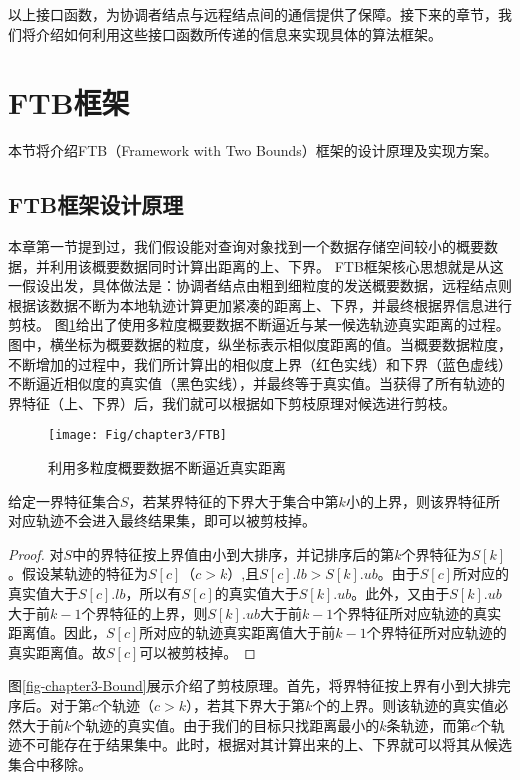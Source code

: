 	以上接口函数，为协调者结点与远程结点间的通信提供了保障。接下来的章节，我们将介绍如何利用这些接口函数所传递的信息来实现具体的算法框架。

\section{FTB框架}\label{sec-c3-FTB}
本节将介绍FTB（Framework with Two Bounds）框架的设计原理及实现方案。
\subsection{FTB框架设计原理}
本章第一节提到过，我们假设能对查询对象找到一个数据存储空间较小的概要数据，并利用该概要数据同时计算出距离的上、下界。
FTB框架核心思想就是从这一假设出发，具体做法是：协调者结点由粗到细粒度的发送概要数据，远程结点则根据该数据不断为本地轨迹计算更加紧凑的距离上、下界，并最终根据界信息进行剪枝。
图\ref{fig-chapter3-FTB}给出了使用多粒度概要数据不断逼近与某一候选轨迹真实距离的过程。图中，横坐标为概要数据的粒度，纵坐标表示相似度距离的值。当概要数据粒度，不断增加的过程中，我们所计算出的相似度上界（红色实线）和下界（蓝色虚线）不断逼近相似度的真实值（黑色实线），并最终等于真实值。当获得了所有轨迹的界特征（上、下界）后，我们就可以根据如下剪枝原理对候选进行剪枝。
\begin{figure}
	\centering
	\texttt{[image: Fig/chapter3/FTB]}
	\caption{利用多粒度概要数据不断逼近真实距离}
	\label{fig-chapter3-FTB}
\end{figure}



\begin{lemma}
	给定一界特征集合$S$，若某界特征的下界大于集合中第$k$小的上界，则该界特征所对应轨迹不会进入最终结果集，即可以被剪枝掉。
\end{lemma}
\begin{proof}
	对$S$中的界特征按上界值由小到大排序，并记排序后的第$k$个界特征为$S[k]$。假设某轨迹的特征为$S[c]$（$c>k$）,且$S[c].lb>S[k].ub$。由于$S[c]$所对应的真实值大于$S[c].lb$，所以有$S[c]$的真实值大于$S[k].ub$。此外，又由于$S[k].ub$大于前$k-1$个界特征的上界，则$S[k].ub$大于前$k-1$个界特征所对应轨迹的真实距离值。因此，$S[c]$所对应的轨迹真实距离值大于前$k-1$个界特征所对应轨迹的真实距离值。故$S[c]$可以被剪枝掉。
\end{proof}
图\ref{fig-chapter3-Bound}展示介绍了剪枝原理。首先，将界特征按上界有小到大排完序后。对于第$c$个轨迹（$c>k$），若其下界大于第$k$个的上界。则该轨迹的真实值必然大于前$k$个轨迹的真实值。由于我们的目标只找距离最小的$k$条轨迹，而第$c$个轨迹不可能存在于结果集中。此时，根据对其计算出来的上、下界就可以将其从候选集合中移除。

